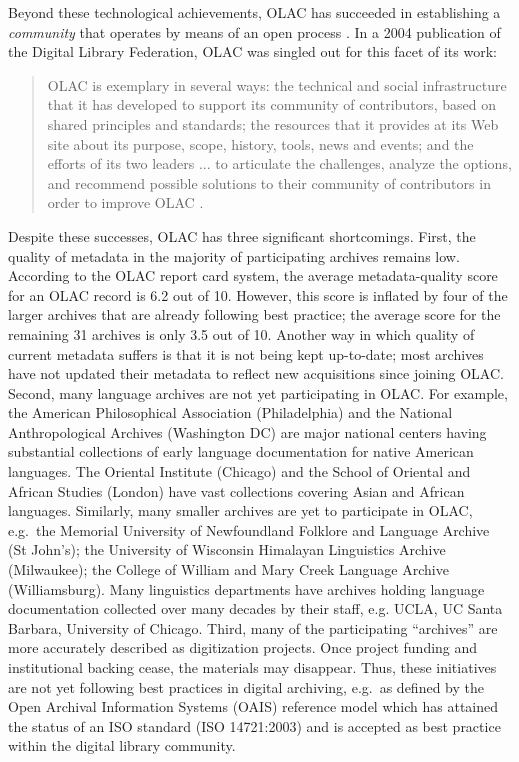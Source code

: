 Beyond these technological achievements, OLAC has succeeded in
establishing a \emph{community} that operates by means of an open
process \citep{OLAC-Process}.  In a 2004 publication of the
Digital Library Federation, OLAC was singled out for this
facet of its work:

\begin{quote} \small
  OLAC is exemplary in several ways: the technical and social
  infrastructure that it has developed to support its community of
  contributors, based on shared principles and standards; the
  resources that it provides at its Web site about its purpose, scope,
  history, tools, news and events; and the efforts of its two leaders
  ... to articulate the challenges, analyze the options, and recommend
  possible solutions to their community of contributors in order to
  improve OLAC \citep{Brogan04}.
\end{quote}


Despite these successes, OLAC has three significant shortcomings.
First, the quality of metadata in the majority of participating archives remains
low.  According to the OLAC report card system, the average 
metadata-quality score for an OLAC record is 6.2 out of 10. However,
this score is
inflated by four of the larger archives that are already
following best practice; the average score for the remaining 31 archives
is only 3.5 out of 10.  Another way in which quality of current metadata suffers
is that it is not being kept up-to-date; most archives have not
updated their metadata to reflect new acquisitions since joining OLAC.
Second, many language archives are not yet participating in OLAC.  For
example, the American Philosophical Association (Philadelphia) and the
National Anthropological Archives (Washington DC) are major national
centers having substantial collections of early language documentation
for native American languages.  The Oriental Institute (Chicago) and
the School of Oriental and African Studies (London) have vast
collections covering Asian and African languages.  Similarly, many
smaller archives are yet to participate in OLAC, e.g.\ the
Memorial University of Newfoundland Folklore and Language Archive (St John's);
the University of Wisconsin Himalayan Linguistics Archive (Milwaukee);
the College of William and Mary Creek Language Archive (Williamsburg).
Many linguistics departments have archives holding language
documentation collected over many decades by their staff, e.g. UCLA,
UC Santa Barbara, University of Chicago.
Third, many of the participating ``archives'' are more accurately described
as digitization projects.  Once project funding and institutional
backing cease, the materials may disappear.  Thus, these
initiatives are not yet following best practices in digital archiving,
e.g.\ as defined by the Open Archival Information Systems (OAIS)
reference model \citep{OAIS02} which has attained the status of an ISO
standard (ISO 14721:2003) and is accepted as best practice within the
digital library community.

